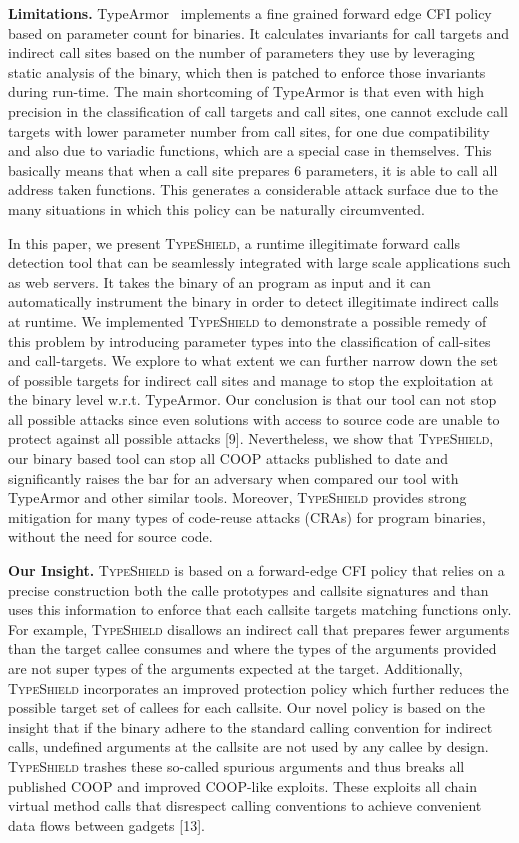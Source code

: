 \textbf{Limitations.} TypeArmor~\cite{veen:typearmor} implements a fine grained forward edge CFI 
policy based on parameter count for binaries. It calculates invariants for call targets and indirect call sites based on
the number of parameters they use by leveraging static analysis of the binary, which then is
patched to enforce those invariants during run-time. The main shortcoming of TypeArmor is that
even with high precision in the classification of 
call targets and call sites, one cannot exclude call targets with lower parameter number from 
call sites, for one due compatibility and also due to variadic functions, which are a special
case in themselves. This basically means that when a call site prepares 6 parameters, it is 
able to call all address taken functions. This generates a considerable attack surface due to the many
situations in which this policy can be naturally circumvented.

In this paper, we present \textsc{TypeShield}, a runtime illegitimate forward 
calls detection tool that can be seamlessly integrated with large scale applications such as web servers.
It takes the binary of an program as input and it can automatically instrument the binary in order
to detect illegitimate indirect calls at runtime. 
We implemented \textsc{TypeShield} to demonstrate a possible remedy of this problem by introducing
parameter types into the classification of call-sites and call-targets. We explore to
what extent we can further narrow down the set of possible targets for indirect call sites
and manage to stop the exploitation at the binary level w.r.t. TypeArmor.
Our conclusion is that our tool can not stop all possible attacks since even solutions 
with access to source code are unable to protect against all possible attacks [9].
Nevertheless, we show that \textsc{TypeShield}, our binary based tool can stop all 
COOP attacks published to date and significantly raises the bar for an adversary when compared our tool with 
TypeArmor and other similar tools. 
Moreover, \textsc{TypeShield} provides strong mitigation for many types of code-reuse attacks
(CRAs) for program binaries, without the need for source code. 

\textbf{Our Insight.} \textsc{TypeShield} is based on a forward-edge CFI policy that 
relies on a precise construction both the calle prototypes and callsite signatures
and than uses this information to enforce that each callsite targets matching functions 
only. For example, \textsc{TypeShield} disallows an indirect call that prepares
fewer arguments than the target callee consumes and where the types of the 
arguments provided are not super types of the arguments expected at the target.
Additionally, \textsc{TypeShield} incorporates an improved protection policy
which further reduces the possible target set of callees for each callsite.
Our novel policy is based on the insight that if the binary adhere to the standard calling convention
for indirect calls, undefined arguments at the callsite are not used by
any callee by design. \textsc{TypeShield} trashes these so-called
spurious arguments and thus breaks all published COOP
and improved COOP-like exploits. These exploits all chain
virtual method calls that disrespect calling conventions to
achieve convenient data flows between gadgets [13].

